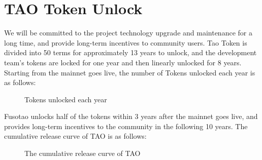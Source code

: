 \documentclass[a4paper,12pt]{article}
\begin{document}
\section{TAO Token Unlock}
\label{sec:3}
We will be committed to the project technology upgrade and maintenance for a long time, and provide long-term incentives to community users. Tao Token is divided into 50 terms for approximately 13 years to unlock, and the development team's tokens are locked for one year and then linearly unlocked for 8 years. Starting from the mainnet goes live, the number of Tokens unlocked each year is as follows:\\

\begin{figure}[htb]        
 \caption{\label{3} Tokens unlocked each year}      
\end{figure}

Fusotao unlocks half of the tokens within 3 years after the mainnet goes live, and provides long-term incentives to the community in the following 10 years. The cumulative release curve of TAO is as follows:\\
\begin{figure}[htb]        
 \caption{\label{4} The cumulative release curve of TAO}      
\end{figure}
\end{document}
